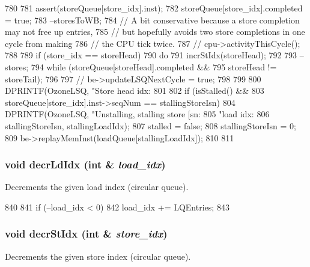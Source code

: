 \begin{DoxyCode}
780 {
781     assert(storeQueue[store_idx].inst);
782     storeQueue[store_idx].completed = true;
783     --storesToWB;
784     // A bit conservative because a store completion may not free up entries,
785     // but hopefully avoids two store completions in one cycle from making
786     // the CPU tick twice.
787 //    cpu->activityThisCycle();
788 
789     if (store_idx == storeHead) {
790         do {
791             incrStIdx(storeHead);
792 
793             --stores;
794         } while (storeQueue[storeHead].completed &&
795                  storeHead != storeTail);
796 
797 //        be->updateLSQNextCycle = true;
798     }
799 
800     DPRINTF(OzoneLSQ, "Store head idx:%
801 
802     if (isStalled() &&
803         storeQueue[store_idx].inst->seqNum == stallingStoreIsn) {
804         DPRINTF(OzoneLSQ, "Unstalling, stalling store [sn:%
805                 "load idx:%
806                 stallingStoreIsn, stallingLoadIdx);
807         stalled = false;
808         stallingStoreIsn = 0;
809         be->replayMemInst(loadQueue[stallingLoadIdx]);
810     }
811 }
\end{DoxyCode}
\hypertarget{classOzoneLSQ_a73fc7794c8562f58407f59513a891c84}{
\subsubsection[{decrLdIdx}]{\setlength{\rightskip}{0pt plus 5cm}void decrLdIdx (int \& {\em load\_\-idx})}}
\label{classOzoneLSQ_a73fc7794c8562f58407f59513a891c84}
Decrements the given load index (circular queue). 


\begin{DoxyCode}
840 {
841     if (--load_idx < 0)
842         load_idx += LQEntries;
843 }
\end{DoxyCode}
\hypertarget{classOzoneLSQ_aa585a02e67713aeeabb73720e6c89388}{
\subsubsection[{decrStIdx}]{\setlength{\rightskip}{0pt plus 5cm}void decrStIdx (int \& {\em store\_\-idx})}}
\label{classOzoneLSQ_aa585a02e67713aeeabb73720e6c89388}
Decrements the given store index (circular queue). 


